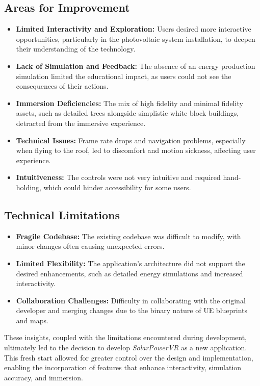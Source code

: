 \documentclass[draft, final]{vutinfth} %
\begin{document}
\subsection{Areas for Improvement}
\begin{itemize}
    \item \textbf{Limited Interactivity and Exploration:} Users desired more interactive opportunities, particularly in the photovoltaic system installation, to deepen their understanding of the technology.
    \item \textbf{Lack of Simulation and Feedback:} The absence of an energy production simulation limited the educational impact, as users could not see the consequences of their actions.
    \item \textbf{Immersion Deficiencies:} The mix of high fidelity and minimal fidelity assets, such as detailed trees alongside simplistic white block buildings, detracted from the immersive experience.
    \item \textbf{Technical Issues:} Frame rate drops and navigation problems, especially when flying to the roof, led to discomfort and motion sickness, affecting user experience.
    \item \textbf{Intuitiveness:} The controls were not very intuitive and required hand-holding, which could hinder accessibility for some users.
\end{itemize}

\subsection{Technical Limitations}
\begin{itemize}
    \item \textbf{Fragile Codebase:} The existing codebase was difficult to modify, with minor changes often causing unexpected errors.
    \item \textbf{Limited Flexibility:} The application's architecture did not support the desired enhancements, such as detailed energy simulations and increased interactivity.
    \item \textbf{Collaboration Challenges:} Difficulty in collaborating with the original developer and merging changes due to the binary nature of UE blueprints and maps.
\end{itemize}

These insights, coupled with the limitations encountered during development, ultimately led to the decision to develop \textit{SolarPowerVR} as a new application. This fresh start allowed for greater control over the design and implementation, enabling the incorporation of features that enhance interactivity, simulation accuracy, and immersion.
\end{document}
